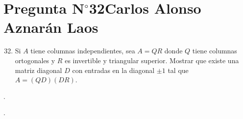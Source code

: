 \section{Pregunta N$^{\circ}$32\qquad Carlos Alonso Aznarán Laos}

\begin{frame}
	\begin{enumerate}\setcounter{enumi}{31}
		\item

		      Si $A$ tiene columnas independientes, sea $A=QR$ donde $Q$
		      tiene columnas ortogonales y $R$ es invertible y triangular
		      superior.
		      Mostrar que existe una matriz diagonal $D$ con entradas en
		      la diagonal $\pm 1$ tal que
		      \begin{math}
			      A=
			      \left(QD\right)
			      \left(DR\right)
		      \end{math}.
	\end{enumerate}

	\begin{solution}

		.
	\end{solution}
\end{frame}

\begin{frame}
	\begin{solution}

		.
	\end{solution}
\end{frame}
